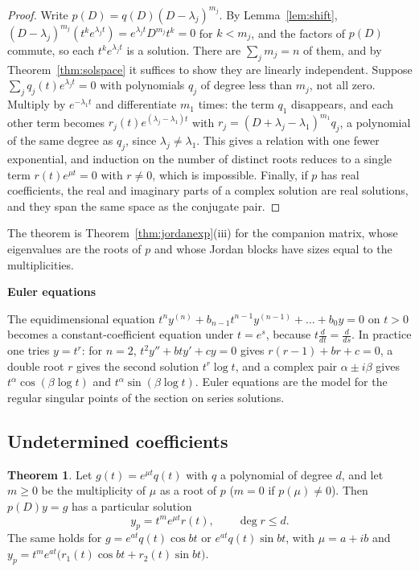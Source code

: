 \documentclass[11pt,a4paper]{article}
\numberwithin{equation}{section}
\theoremstyle{definition}
\newtheorem{thm}{Theorem}[subsection]
\newcommand{\subhead}[1]{%
  \par\medskip\noindent\textbf{#1}\par\nobreak\smallskip}
\begin{document}
\begin{proof}
Write $p(D) = q(D)(D - \lambda_j)^{m_j}$. By Lemma~\ref{lem:shift}, $(D - \lambda_j)^{m_j}(t^ke^{\lambda_jt}) = e^{\lambda_jt}D^{m_j}t^k = 0$ for $k < m_j$, and the factors of $p(D)$ commute, so each $t^ke^{\lambda_jt}$ is a solution. There
are $\sum_jm_j = n$ of them, and by Theorem~\ref{thm:solspace} it suffices to show they are linearly independent. Suppose $\sum_jq_j(t)e^{\lambda_jt} = 0$ with polynomials $q_j$ of degree
less than $m_j$, not all zero. Multiply by $e^{-\lambda_1t}$ and differentiate $m_1$ times: the term $q_1$ disappears, and each other term becomes $r_j(t)e^{(\lambda_j - \lambda_1)t}$ with $r_j = (D + \lambda_j - \lambda_1)^{m_1}q_j$, a
polynomial of the same degree as $q_j$, since $\lambda_j \neq \lambda_1$. This gives a relation with one fewer exponential, and induction on the number of distinct roots reduces to a single
term $r(t)e^{\mu t} = 0$ with $r \neq 0$, which is impossible. Finally, if $p$ has real coefficients, the real and imaginary parts of a complex solution are real solutions, and they span the
same space as the conjugate pair.
\end{proof}

The theorem is Theorem~\ref{thm:jordanexp}(iii) for the companion matrix, whose eigenvalues are the roots of $p$ and whose Jordan blocks have sizes equal to the multiplicities.

\subhead{Euler equations}
The equidimensional equation $t^ny^{(n)} + b_{n-1}t^{n-1}y^{(n-1)} + \dots + b_0y = 0$ on $t > 0$ becomes a constant-coefficient equation under $t = e^s$, because $t\frac{d}{dt} = \frac{d}{ds}$. In practice one tries
$y = t^r$: for $n = 2$, $t^2y'' + bty' + cy = 0$ gives $r(r - 1) + br + c = 0$, a double root $r$ gives the second solution $t^r\log t$, and a complex pair $\alpha \pm i\beta$ gives $t^\alpha\cos(\beta\log t)$
and $t^\alpha\sin(\beta\log t)$. Euler equations are the model for the regular singular points of the section on series solutions.

\subsection{Undetermined coefficients}
\label{ssec:undet}

\begin{thm}
\label{thm:undet}
Let $g(t) = e^{\mu t}q(t)$ with $q$ a polynomial of degree $d$, and let $m \geq 0$ be the multiplicity of $\mu$ as a root of $p$ ($m = 0$ if $p(\mu) \neq 0$). Then $p(D)y = g$ has a particular solution
\[
y_p = t^me^{\mu t}r(t), \qquad \deg r \leq d .
\]
The same holds for $g = e^{at}q(t)\cos bt$ or $e^{at}q(t)\sin bt$, with $\mu = a + ib$ and $y_p = t^me^{at}\bigl(r_1(t)\cos bt + r_2(t)\sin bt\bigr)$.
\end{thm}
\end{document}
